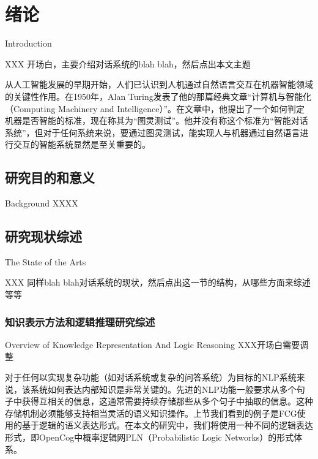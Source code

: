 \chapter{绪论}{Introduction}
\label{chap:intro}


XXX 开场白，主要介绍对话系统的blah blah，然后点出本文主题

      从人工智能发展的早期开始，人们已认识到人机通过自然语言交互在机器智能领域的关键性作用。在1950年，Alan Turing发表了他的那篇经典文章“计算机与智能化（Computing  Machinery and Intelligence）”。在文章中，他提出了一个如何判定机器是否智能的标准，现在称其为“图灵测试”。他并没有称这个标准为“智能对话系统”，但对于任何系统来说，要通过图灵测试，能实现人与机器通过自然语言进行交互的智能系统显然是至关重要的。

\section{研究目的和意义}{Background}
XXXX

\section{研究现状综述}{The State of the Arts}
\label{sec:review}

XXX 同样blah blah对话系统的现状，然后点出这一节的结构，从哪些方面来综述等等



\subsection{知识表示方法和逻辑推理研究综述}{Overview of Knowledge Representation And Logic Reasoning}
XXX开场白需要调整

对于任何以实现复杂功能（如对话系统或复杂的问答系统）为目标的NLP系统来说，该系统如何表达内部知识是非常关键的。先进的NLP功能一般要求从多个句子中获得互相关的信息，这通常需要持续存储那些从多个句子中抽取的信息。这种存储机制必须能够支持相当灵活的语义知识操作。上节我们看到的例子是FCG使用的基于逻辑的语义表达形式。在本文的研究中，我们将使用一种不同的逻辑表达形式，即OpenCog中概率逻辑网PLN（Probabilistic Logic Networks）的形式体系。


